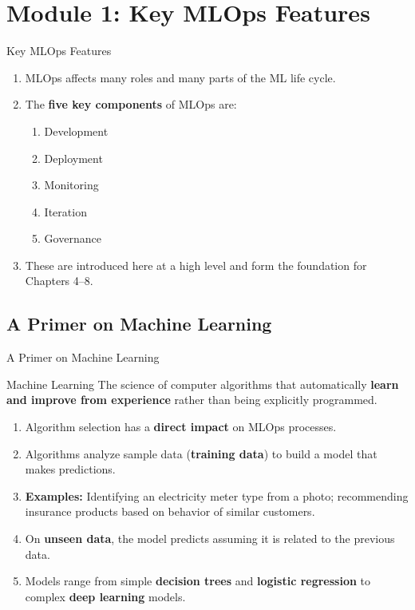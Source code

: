 \section{Module 1: Key MLOps Features}

\begin{frame}{Key MLOps Features}
\begin{enumerate}
\item<1-> MLOps affects many roles and many parts of the ML life cycle.
\item<2-> The \textbf{five key components} of MLOps are:
    \begin{enumerate}
    \item Development
    \item Deployment
    \item Monitoring
    \item Iteration
    \item Governance
    \end{enumerate}
\item<3-> These are introduced here at a high level and form the foundation for Chapters 4--8.
\end{enumerate}
\end{frame}

\subsection{A Primer on Machine Learning}

\begin{frame}{A Primer on Machine Learning}
\begin{block}{Machine Learning}
The science of computer algorithms that automatically \textbf{learn and improve from experience} rather than being explicitly programmed.
\end{block}
\vspace{0.1cm}
\begin{enumerate}
\item<1-> Algorithm selection has a \textbf{direct impact} on MLOps processes.
\item<2-> Algorithms analyze sample data (\textbf{training data}) to build a model that makes predictions.
\item<3-> \textbf{Examples:} Identifying an electricity meter type from a photo; recommending insurance products based on behavior of similar customers.
\item<4-> On \textbf{unseen data}, the model predicts assuming it is related to the previous data.
\item<5-> Models range from simple \textbf{decision trees} and \textbf{logistic regression} to complex \textbf{deep learning} models.
\end{enumerate}
\end{frame}

